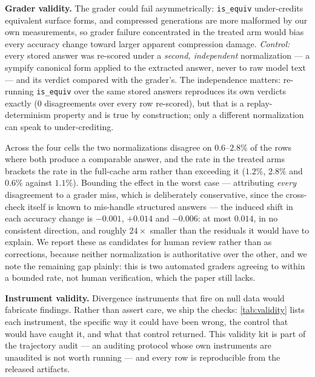 \documentclass{article}
\begin{document}
\textbf{Grader validity.} The grader could fail asymmetrically: \texttt{is\_equiv} under-credits equivalent surface forms, and compressed generations are more malformed by our own measurements, so grader failure concentrated in the treated arm would bias every accuracy change toward larger apparent compression damage. \emph{Control:} every stored answer was re-scored under a \emph{second, independent} normalization --- a sympify canonical form applied to the extracted answer, never to raw model text --- and its verdict compared with the grader's. The independence matters: re-running \texttt{is\_equiv} over the same stored answers reproduces its own verdicts exactly (0 disagreements over every row re-scored), but that is a replay-determinism property and is true by construction; only a different normalization can speak to under-crediting.

Across the four cells the two normalizations disagree on $0.6$--$2.8\%$ of the rows where both produce a comparable answer, and the rate in the treated arms brackets the rate in the full-cache arm rather than exceeding it ($1.2\%$, $2.8\%$ and $0.6\%$ against $1.1\%$). Bounding the effect in the worst case --- attributing \emph{every} disagreement to a grader miss, which is deliberately conservative, since the cross-check itself is known to mis-handle structured answers --- the induced shift in each accuracy change is $-0.001$, $+0.014$ and $-0.006$: at most $0.014$, in no consistent direction, and roughly $24\times$ smaller than the residuals it would have to explain. We report these as candidates for human review rather than as corrections, because neither normalization is authoritative over the other, and we note the remaining gap plainly: this is two automated graders agreeing to within a bounded rate, not human verification, which the paper still lacks.

\textbf{Instrument validity.} Divergence instruments that fire on null data would fabricate findings. Rather than assert care, we ship the checks: \cref{tab:validity} lists each instrument, the specific way it could have been wrong, the control that would have caught it, and what that control returned. This validity kit is part of the trajectory audit --- an auditing protocol whose own instruments are unaudited is not worth running --- and every row is reproducible from the released artifacts.
\end{document}

